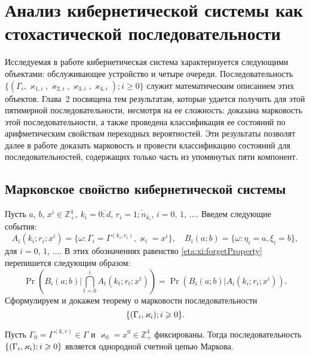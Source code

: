 \chapter{Анализ кибернетической системы как стохастической последовательности}						%

Исследуемая в работе кибернетическая система характеризуется следующими объектами:  обслуживающее устройство и четыре очереди. Последовательность 
 $\{(\Gamma_i,  \varkappa_{1, i},  \varkappa_{2, i},  \varkappa_{3, i},   \varkappa_{4, i}); i \geqslant 0\}$ служит математическим описанием этих объектов. Глава~2 посвящена тем результатам,  которые удается получить для этой пятимерной последовательности,  несмотря на ее сложность: доказана марковость этой последовательности,  а также проведена классификация ее состояний по арифметическим свойствам переходных вероятностей. Эти результаты позволят далее в работе доказать марковость и провести классификацию состояний для последовательностей,  содержащих только часть из упомянутых пяти компонент.

\section[Марковское свойство кибернетической системы]%
{Марковское свойство кибернетической системы}
Пусть $a$,  $b$,  $x^i \in \mathbb{Z}_+^4$,  $k_i=\overline{0;d}$,  $r_i=\overline{1;n_{k_i}}$,  $i=0$,  $1$,  $\ldots$. Введем следующие события:
\begin{equation}
A_i(k_i;r_i;x^i) = \{\omega\colon\Gamma_i=\Gamma^{(k_i, r_i)},  \varkappa_i=x^i\},  \quad  B_i(a;b) = \{\omega\colon\eta_i=a,  \xi_i=b\}, 
\label{A:definition}
\end{equation}
 для $i=0$,  $1$,  $\ldots$.
В этих обозначениях равенство \eqref{eta:xi:forgetProperty}  перепишется следующим образом:
\begin{equation}
\Pr (B_i(a;b) | \bigcap_{t=0}^{i} A_t(k_t;r_t;x^t)) = \Pr (B_i(a;b) |  A_i(k_i;r_i;x^i)).
\label{new:notation:eta:xi:forget}
\end{equation}
Сформулируем и докажем теорему о марковости последовательности 
$$\Mark.$$
\begin{theorem}
Пусть $\Gamma_0=\Gamma^{(k, r)}\in \Gamma$ и $\varkappa_0=x^0\in \mathbb{Z}_+^4$ фиксированы. Тогда последовательность $\Mark$ является однородной счетной цепью Маркова. 
\end{theorem}

